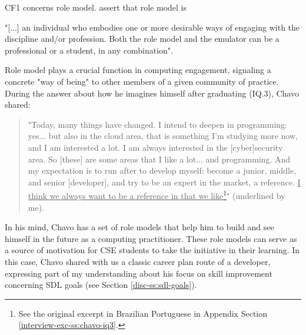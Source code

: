 \acrshort{CF}1 concerns role model.  assert that role model is
\begin{citacao}
    "[...] an individual who embodies one or more desirable ways of engaging with the discipline and/or profession. Both the role model and the emulator can be a professional or a student, in any combination".
\end{citacao}
Role model plays a crucial function in computing engagement, signaling a concrete "way of being" to other members of a given community of practice. During the answer about how he imagines himself after graduating (\acrshort{IQ}.3), Chavo shared:
\begin{quote}
    "Today, many things have changed. I intend to deepen in programming: yes... but also in the cloud area, that is something I'm studying more now, and I am interested a lot. I am always interested in the [cyber]security area. So [these] are some areas that I like a lot... and programming. And my expectation is to run after to develop myself: become a junior, middle, and senior [developer], and try to be an expert in the market, a reference. \underline{I think we always want to be a reference in that we like}\footnote{See the original excerpt in Brazilian Portuguese in Appendix Section \ref{interview-exc-ss:chavo-iq3}.}" (underlined by me).
\end{quote}
In his mind, Chavo has a set of role models that help him to build and see himself in the future as a computing practitioner. These role models can serve as a source of motivation for \gls{CSE} students to take the initiative in their learning. In this case, Chavo shared with us a classic career plan route of a developer, expressing part of my understanding about his focus on skill improvement concerning \gls{SDL} goals (see Section \ref{disc-ss:sdl-goals}).

